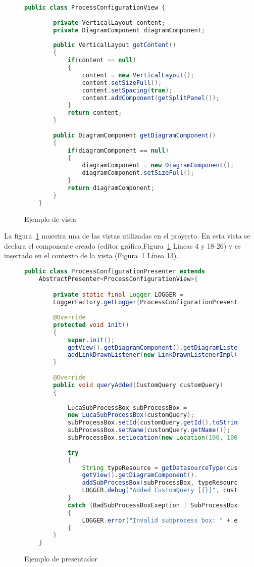 

\begin{figure}[H]
	\centering
	\begin{lstlisting}[language=Java]
	public class ProcessConfigurationView {
			
		private VerticalLayout content;
		private DiagramComponent diagramComponent;
		
		public VerticalLayout getContent()
		{
			if(content == null)
			{
				content = new VerticalLayout();
				content.setSizeFull();
				content.setSpacing(true);
				content.addComponent(getSplitPanel());
			}
			return content;
		}
		
		public DiagramComponent getDiagramComponent()
		{
			if(diagramComponent == null)
			{
				diagramComponent = new DiagramComponent();
				diagramComponent.setSizeFull();
			}
			return diagramComponent;
		}
	}\end{lstlisting}
	\caption{Ejemplo de vista}
	\label{fig:viewExample}
\end{figure}

La figura~\ref{fig:viewExample} muestra una de las vistas utilizadas en el proyecto. En esta vista se declara el componente creado (editor gráfico,Figura~\ref{fig:viewExample} Líneas 4 y 18-26) y es insertado en el contexto de la vista (Figura~\ref{fig:viewExample} Línea 13).


\begin{figure}[H]
	\centering
	\begin{lstlisting}[language=Java]
	public class ProcessConfigurationPresenter extends 
	AbstractPresenter<ProcessConfigurationView>{

		private static final Logger LOGGER = 
		LoggerFactory.getLogger(ProcessConfigurationPresenter.class);
		
		@Override
		protected void init()
		{	
			super.init();
			getView().getDiagramComponent().getDiagramListener().
			addLinkDrawnListener(new LinkDrawnListenerImpl());
		}
		
		@Override
		public void queryAdded(CustomQuery customQuery)
		{
		
			LucaSubProcessBox subProcessBox = 
			new LucaSubProcessBox(customQuery);
			subProcessBox.setId(customQuery.getId().toString());
			subProcessBox.setName(customQuery.getName());
			subProcessBox.setLocation(new Location(100, 100));
		
			try
			{	
				String typeResource = getDatasourceType(customQuery);
				getView().getDiagramComponent().
				addSubProcessBox(subProcessBox, typeResource);
				LOGGER.debug("Added CustomQuery [{}]", customQuery.getName());
			}
			catch (BadSubProcessBoxExeption | SubProcessBoxExists e)
			{
				LOGGER.error("Invalid subprocess box: " + e.getMessage());
			{
		}
	}\end{lstlisting}
	\caption{Ejemplo de presentador}
	\label{fig:presenterExample}
\end{figure}

